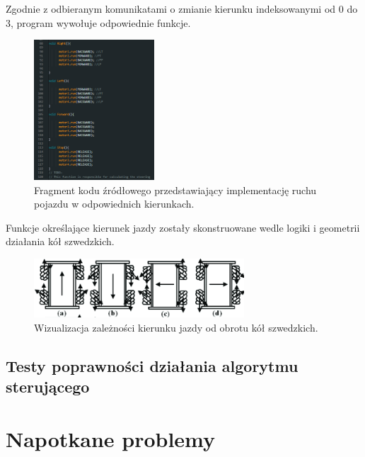 \documentclass{report}
\begin{document}
Zgodnie z odbieranym komunikatami o zmianie kierunku indeksowanymi od 0 do 3, program wywołuje odpowiednie funkcje. 

\begin{figure}[H]
    \centering
    \includegraphics*[width=0.4\textwidth]{"src/code_snaps/movement_implementation.png"}
    \caption{Fragment kodu źródłowego przedstawiający implementację ruchu pojazdu w odpowiednich kierunkach.}
    \label{fig:sensor_init}
\end{figure}

Funkcje określające kierunek jazdy zostały skonstruowane wedle logiki i geometrii działania kół szwedzkich.

\begin{figure}[H]
    \centering
    \includegraphics*[width=0.7\textwidth]{"src/Robot_pics/Movement.png"}
    \caption{Wizualizacja zależności kierunku jazdy od obrotu kół szwedzkich.}
    \label{fig:sensor_init}
\end{figure}

\subsection{\Large Testy poprawności działania algorytmu sterującego}

%
%

\section{\LARGE Napotkane problemy}
\end{document}
